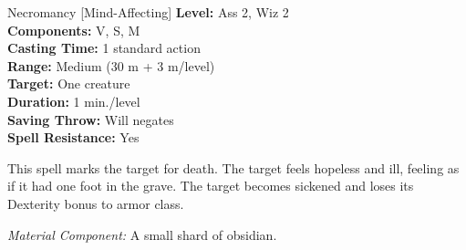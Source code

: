 {Necromancy [Mind-Affecting]}
{
	\textbf{Level:}
	Ass 2, Wiz 2\\
	\textbf{Components:}
	V, S, M\\
	\textbf{Casting Time:}
	1 standard action\\
	\textbf{Range:}
	Medium (30 m + 3 m/level)\\
	\textbf{Target:}
	One creature\\
	\textbf{Duration:}
	1 min./level\\
	\textbf{Saving Throw:}
	Will negates\\
	\textbf{Spell Resistance:}
	Yes\\
}
{
	This spell marks the target for death. The target feels hopeless and ill, feeling as if it had one foot in the grave. The target becomes sickened and loses its Dexterity bonus to armor class.

	\textit{Material Component:} A small shard of obsidian.
}
